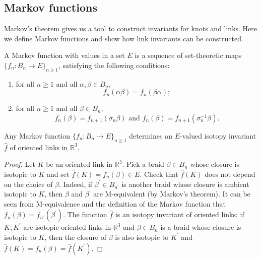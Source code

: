 \subsection{Markov functions}

Markov's theorem gives us a tool to construct invariants for knots and links. Here we define Markov functions and show how link invariants can be constructed.

  \begin{definition}
  A Markov function with values in a set $E$ is a sequence of set-theoretic maps $\{ f_n: B_n \to E \}_{n\geq 1}$, satisfying the following conditions: 
\begin{enumerate}
\item\label{item:13} for all $n \geq 1$ and all $\alpha, \beta \in B_n$, 
\begin{displaymath}
f_n(\alpha \beta ) = f_n (\beta \alpha);
\end{displaymath} 
\item\label{item:14} for all $n \geq 1$ and all $\beta \in B_n$, 
\begin{displaymath}
f_n(\beta) = f_{n+1}(\sigma_n \beta) \text{ and } f_n(\beta) = f_{n+1}(\sigma_n^{-1} \beta).
\end{displaymath}
\end{enumerate}
\end{definition}

\begin{theorem}
  \label{markovisotopy}
  Any Markov function $\{ f_n : B_n \to E \}_{n \geq 1}$ determines an $E$-valued isotopy invariant $\hat{f}$ of oriented links in $\mathbb{R}^3$.
\end{theorem}
\begin{proof}
  Let $K$ be an oriented link in $\mathbb{R}^3$. Pick a braid $\beta \in B_n$ whose closure is isotopic to $K$ and set $\hat{f}(K) = f_n(\beta) \in E$. Check that $\hat{f}(K)$ does not depend on the choice of $\beta$. Indeed, if $\beta^{\prime} \in B_{n^{\prime}}$ is another braid whose closure is ambient isotopic to $K$, then $\beta$ and $\beta^{\prime}$ are M-equivalent (by Markov's theorem). It can be seen from M-equivalence and the definition of the Markov function that $f_n(\beta) = f_{n^{\prime}}(\beta^{\prime})$. The function $\hat{f}$ is an isotopy invariant of oriented links: if $K, K^{\prime}$ are isotopic oriented links in $\mathbb{R}^3$ and $\beta \in B_n$ is a braid whose closure is isotopic to $K$, then the closure of $\beta$ is also isotopic to $K^{\prime}$ and $\hat{f}(K) = f_n(\beta) = \hat{f}(K^{\prime})$.
\end{proof}


